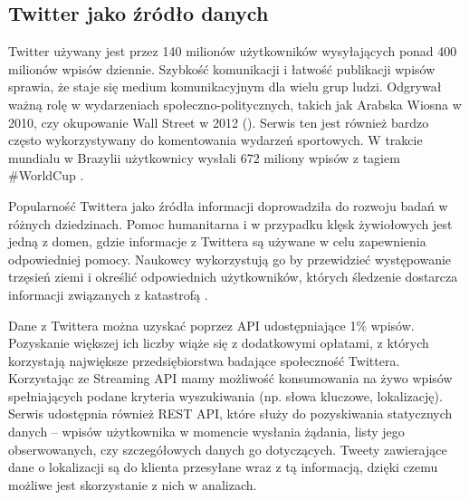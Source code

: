 \subsection{Twitter jako źródło danych}
Twitter używany jest przez 140 milionów użytkowników wysyłających ponad 400 
milionów wpisów dziennie. Szybkość komunikacji i łatwość publikacji wpisów
sprawia, że staje się medium komunikacyjnym dla wielu grup ludzi.
Odgrywał ważną rolę w wydarzeniach społeczno-politycznych,
takich jak Arabska Wiosna w 2010, czy okupowanie Wall Street w 2012 
(\cite{TwitterDataAnalytics2013}).
Serwis ten jest również bardzo często wykorzystywany do komentowania wydarzeń
sportowych. W trakcie mundialu w Brazylii użytkownicy wysłali 672 miliony
wpisów z tagiem \#WorldCup \cite{TwitterStatsWorldCup}.

Popularność Twittera jako źródła informacji doprowadziła do rozwoju badań
w różnych dziedzinach. Pomoc humanitarna i w przypadku klęsk żywiołowych
jest jedną z domen, gdzie informacje z Twittera są używane w celu zapewnienia
odpowiedniej pomocy. Naukowcy wykorzystują go by przewidzieć występowanie trzęsień
ziemi i określić odpowiednich użytkowników, których śledzenie dostarcza informacji
związanych z katastrofą \cite{TwitterDataAnalytics2013}.

Dane z Twittera można uzyskać poprzez API udostępniające 1\% wpisów.
Pozyskanie większej ich liczby wiąże się z dodatkowymi opłatami, z których
korzystają największe przedsiębiorstwa badające społeczność Twittera.
Korzystając ze Streaming API mamy możliwość konsumowania na żywo
wpisów spełniających podane kryteria wyszukiwania (np. słowa kluczowe, lokalizację).
Serwis udostępnia również REST API, które służy do pozyskiwania statycznych danych
-- wpisów użytkownika w momencie wysłania żądania, listy jego obserwowanych,
czy szczegółowych danych go dotyczących. Tweety zawierające dane o lokalizacji
są do klienta przesyłane wraz z tą informacją, dzięki czemu możliwe jest
skorzystanie z nich w analizach.

